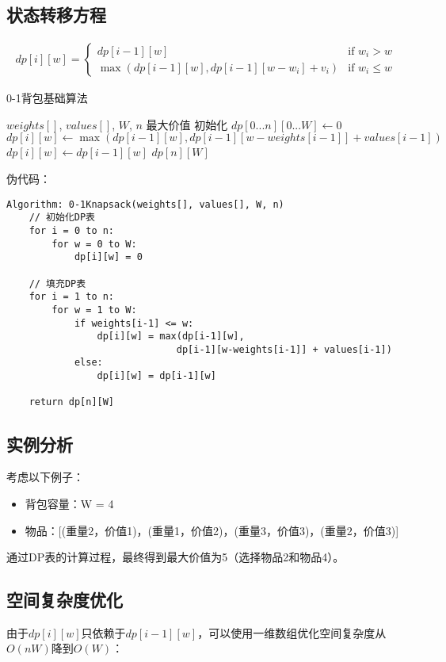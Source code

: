 \subsection{状态转移方程}
\begin{align}
dp[i][w] = \begin{cases}
dp[i-1][w] & \text{if } w_i > w \\
\max(dp[i-1][w], dp[i-1][w-w_i] + v_i) & \text{if } w_i \leq w
\end{cases}
\end{align}

\begin{algorithm}
\caption{0-1背包基础算法}
\begin{algorithmic}[1]
\REQUIRE $weights[]$, $values[]$, $W$, $n$
\ENSURE 最大价值
\STATE 初始化 $dp[0...n][0...W] \leftarrow 0$
            \STATE $dp[i][w] \leftarrow \max(dp[i-1][w], dp[i-1][w-weights[i-1]] + values[i-1])$
        \ELSE
            \STATE $dp[i][w] \leftarrow dp[i-1][w]$
        \ENDIF
    \ENDFOR
\ENDFOR
\RETURN $dp[n][W]$
\end{algorithmic}
\end{algorithm}

伪代码：
\begin{verbatim}
Algorithm: 0-1Knapsack(weights[], values[], W, n)
    // 初始化DP表
    for i = 0 to n:
        for w = 0 to W:
            dp[i][w] = 0
    
    // 填充DP表
    for i = 1 to n:
        for w = 1 to W:
            if weights[i-1] <= w:
                dp[i][w] = max(dp[i-1][w], 
                              dp[i-1][w-weights[i-1]] + values[i-1])
            else:
                dp[i][w] = dp[i-1][w]
    
    return dp[n][W]
\end{verbatim}

\subsection{实例分析}
考虑以下例子：
\begin{itemize}
\item 背包容量：W = 4
\item 物品：[(重量2，价值1)，(重量1，价值2)，(重量3，价值3)，(重量2，价值3)]
\end{itemize}

通过DP表的计算过程，最终得到最大价值为5（选择物品2和物品4）。

\subsection{空间复杂度优化}
由于$dp[i][w]$只依赖于$dp[i-1][w]$，可以使用一维数组优化空间复杂度从$O(nW)$降到$O(W)$：

